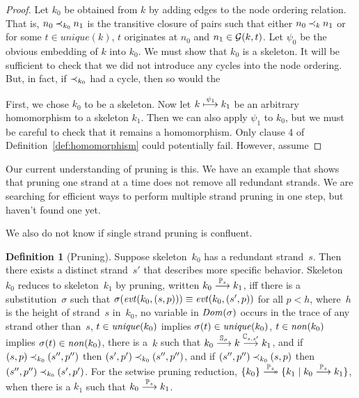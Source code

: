 \documentclass[12pt]{article}
\theoremstyle{definition}
\newtheorem{defn}{Definition}[section]
\newenvironment{note}{\itshape\par\noindent}{}
\begin{document}
\begin{proof}
Let $k_0$ be obtained from $k$ by adding edges to the node
ordering relation.  That is, $n_0\mathbin{\prec_{k_0}}n_1$ is the transitive
closure of pairs such that
either $n_0\mathbin{\prec_{k}}n_1$ or for some $t\in unique(k)$, $t$ originates
at $n_0$ and $n_1\in\mathcal{G}(k,t)$.  Let $\psi_0$ be the obvious
embedding of $k$ into $k_0$.  We must show that $k_0$ is
a skeleton.  It will be sufficient to check that we did not introduce
any cycles into the node ordering.  But, in fact, if $\mathbin{\prec_{k_0}}$
had a cycle, then so would the

First, we chose $k_0$ to be a skeleton.  Now let $k\stackrel{\psi_1}{\longmapsto}k_1$
be an arbitrary homomorphism to a skeleton $k_1$.  Then we can also
apply $\psi_1$ to $k_0$, but we must be careful to check that it remains
a homomorphism.  Only clause 4 of Definition~\ref{def:homomorphism} could
potentially fail.  However, assume
\end{proof}

\begin{note}
Our current understanding of pruning is this.  We have an example that
shows that pruning one strand at a time does not remove all redundant
strands.  We are searching for efficient ways to perform multiple
strand pruning in one step, but haven't found one yet.

We also do not know if single strand pruning is confluent.
\end{note}

\begin{defn}[Pruning]\label{def:pruning}
Suppose skeleton~$k_0$ has a redundant strand~$s$.  Then there exists
a distinct strand~$s'$ that describes more specific behavior.
Skeleton~$k_0$ reduces to skeleton~$k_1$ by pruning, written
$k_0\stackrel{\mathbb P_s}{\longrightarrow}k_1$, iff there is a substitution~$\sigma$
such that $\sigma(\operatorname{\mathit{evt}}(k_0,(s,p)))\equiv \operatorname{\mathit{evt}}(k_0,(s',p))$ for
all $p<h$, where~$h$ is the height of strand~$s$ in~$k_0$, no variable
in $\operatorname{\mathit{Dom}}(\sigma)$ occurs in the trace of any strand other
than~$s$, $t\in\operatorname{\mathit{unique}}(k_0)$ implies
$\sigma(t)\in\operatorname{\mathit{unique}}(k_0)$, $t\in\operatorname{\mathit{non}}(k_0)$ implies
$\sigma(t)\in\operatorname{\mathit{non}}(k_0)$, there is a~$k$ such that
$k_0\stackrel{\mathbb S_\sigma}{\longrightarrow}k\stackrel{\mathbb C_{s,s'}}{\longrightarrow}k_1$, and if
$(s,p)\mathbin{\prec_{k_0}}(s'',p'')$ then $(s',p')\mathbin{\prec_{k_0}}(s'',p'')$, and if
$(s'',p'')\mathbin{\prec_{k_0}}(s,p)$ then $(s'',p'')\mathbin{\prec_{k_0}}(s',p')$.  For
the setwise pruning reduction,
$\{k_0\}\setreduction{\ops{P}_s}\{k_1\mid
k_0\reduction{\ops{P}_s}k_1\}$, when there is a $k_1$ such that
$k_0\stackrel{\mathbb P_s}{\longrightarrow}k_1$.
\end{defn}
\end{document}

